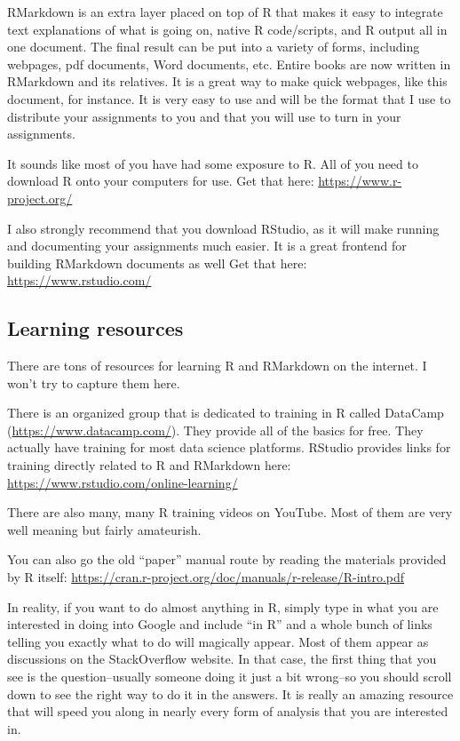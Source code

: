 \documentclass[]{book}
\begin{document}
RMarkdown is an extra layer placed on top of R that makes it easy to integrate text explanations of what is going on, native R code/scripts, and R output all in one document. The final result can be put into a variety of forms, including webpages, pdf documents, Word documents, etc. Entire books are now written in RMarkdown and its relatives. It is a great way to make quick webpages, like this document, for instance. It is very easy to use and will be the format that I use to distribute your assignments to you and that you will use to turn in your assignments.

It sounds like most of you have had some exposure to R. All of you need to download R onto your computers for use. Get that here:
\url{https://www.r-project.org/}

I also strongly recommend that you download RStudio, as it will make running and documenting your assignments much easier. It is a great frontend for building RMarkdown documents as well Get that here:
\url{https://www.rstudio.com/}

\hypertarget{learning-resources}{%
\subsection{Learning resources}\label{learning-resources}}

There are tons of resources for learning R and RMarkdown on the internet. I won't try to capture them here.

There is an organized group that is dedicated to training in R called DataCamp (\url{https://www.datacamp.com/}). They provide all of the basics for free. They actually have training for most data science platforms. RStudio provides links for training directly related to R and RMarkdown here:
\url{https://www.rstudio.com/online-learning/}

There are also many, many R training videos on YouTube. Most of them are very well meaning but fairly amateurish.

You can also go the old ``paper'' manual route by reading the materials provided by R itself:
\url{https://cran.r-project.org/doc/manuals/r-release/R-intro.pdf}

In reality, if you want to do almost anything in R, simply type in what you are interested in doing into Google and include ``in R'' and a whole bunch of links telling you exactly what to do will magically appear. Most of them appear as discussions on the StackOverflow website. In that case, the first thing that you see is the question--usually someone doing it just a bit wrong--so you should scroll down to see the right way to do it in the answers. It is really an amazing resource that will speed you along in nearly every form of analysis that you are interested in.
\end{document}

